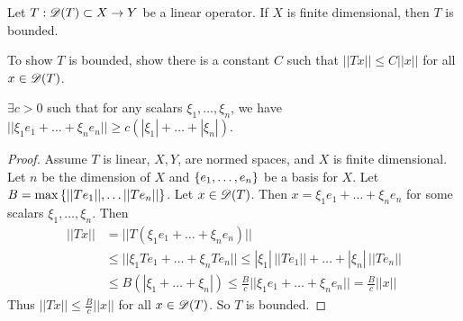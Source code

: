 \documentclass[]{article}
\begin{document}
\begin{theorem}
	Let $T:\mathscr{D}(T)\subset X\rightarrow Y$ be a linear operator. If $X$ is finite dimensional, then $T$ is bounded.
\end{theorem}
\begin{recall}
	To show $T$ is bounded, show there is a constant $C$ such that $||Tx||\leq C||x||$ for all $x\in\mathscr{D}(T)$.
\end{recall}
\begin{recall}
	$\exists c>0$ such that for any scalars $\xi_1,\dots,\xi_n$, we have $||\xi_1e_1+\dots+\xi_ne_n||\geq c(|\xi_1|+\dots+|\xi_n|)$.
\end{recall}
\begin{proof}
	Assume $T$ is linear, $X,Y$, are normed spaces, and $X$ is finite dimensional.
	Let $n$ be the dimension of $X$ and $\left\{ e_1,\dots,e_n \right\}$ be a basis for $X$.
	Let $B = \max\left\{ ||Te_1||,\dots||Te_n|| \right\}$.
	Let $x\in\mathscr{D}(T)$. Then $x=\xi_1e_1+\dots+\xi_ne_n$ for some scalars $\xi_1,\dots,\xi_n$.
	Then 
	\begin{align*}
		||Tx|| &= ||T(\xi_1e_1+\dots+\xi_ne_n)|| \\
			   &\leq ||\xi_1Te_1+\dots+\xi_nTe_n||
			   \leq |\xi_1|\,||Te_1||+\dots+|\xi_n|\,||Te_n|| \\
			   &\leq B(|\xi_1+\dots+\xi_n|)
			   \leq \frac Bc||\xi_1e_1+\dots+\xi_ne_n||
			   = \frac Bc||x||
	\end{align*}
	Thus $||Tx||\leq\frac Bc||x||$ for all $x\in\mathscr{D}(T)$.
	So $T$ is bounded.
\end{proof}
\end{document}
